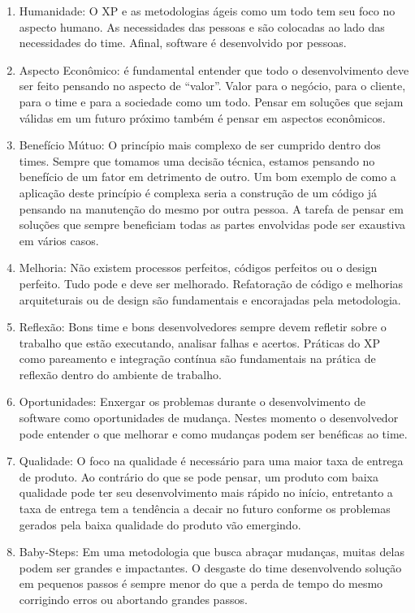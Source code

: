 \begin{enumerate}

	\item Humanidade: O XP e as metodologias ágeis como um todo tem seu foco no aspecto humano. As necessidades das pessoas e são colocadas ao lado das necessidades do time. Afinal, software é desenvolvido por pessoas.

	\item Aspecto Econômico: é fundamental entender que todo o desenvolvimento deve ser feito pensando no aspecto de “valor”. Valor para o negócio, para o cliente, para o time e para a sociedade como um todo. Pensar em soluções que sejam válidas em um futuro próximo também é pensar em aspectos econômicos.

	\item Benefício Mútuo:  O princípio mais complexo de ser cumprido dentro dos times. Sempre que tomamos uma decisão técnica, estamos pensando no benefício de um fator em detrimento de outro. Um bom exemplo  de como a aplicação deste princípio é complexa seria a construção de um código já pensando na manutenção do mesmo por outra pessoa. A tarefa de pensar em soluções que sempre beneficiam todas as partes envolvidas pode ser exaustiva em vários casos.

	\item Melhoria:  Não existem processos perfeitos, códigos perfeitos ou o design perfeito. Tudo pode e deve ser melhorado. Refatoração de código e melhorias arquiteturais ou de design são fundamentais e encorajadas pela metodologia.

	\item Reflexão:   Bons time e bons desenvolvedores sempre devem refletir sobre o trabalho que estão executando, analisar falhas e acertos. Práticas do XP como pareamento e integração contínua são fundamentais na prática de reflexão dentro do ambiente de trabalho.

	\item Oportunidades: Enxergar os problemas durante o desenvolvimento de software como oportunidades de mudança. Nestes momento o desenvolvedor pode entender o que melhorar e como mudanças podem ser benéficas ao time.

 	\item Qualidade: O foco na qualidade é necessário para uma maior taxa de entrega de produto. Ao contrário do que se pode pensar, um produto com baixa qualidade pode ter seu desenvolvimento mais rápido no início, entretanto a taxa de entrega tem a tendência a decair no futuro conforme os problemas gerados pela baixa qualidade do produto vão emergindo.

	\item Baby-Steps: Em uma metodologia que busca abraçar mudanças, muitas delas podem ser grandes e impactantes. O desgaste do time desenvolvendo solução em pequenos passos é sempre menor do que a perda de tempo do mesmo corrigindo erros ou abortando grandes passos.

\end{enumerate}



